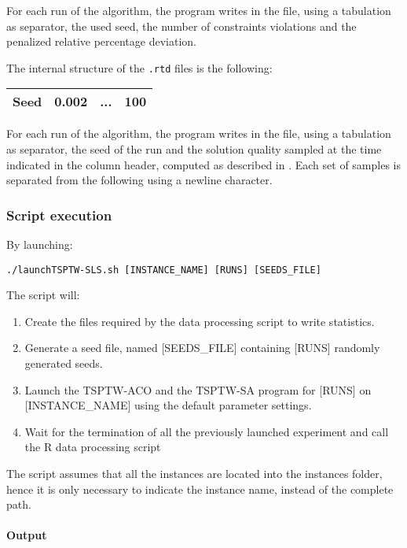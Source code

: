 \documentclass{article}
\begin{document}
For each run of the algorithm, the program writes in the file, using a tabulation as separator, the used seed, the number of constraints violations and the penalized relative percentage deviation.


The internal structure of the \verb|.rtd| files is the following: 
\begin{tabular}{|c|c|c|c|}
\hline
\textbf{Seed}	&	\textbf{0.002} & \textbf{...} & \textbf{100}  \\ \hline
\end{tabular}

For each run of the algorithm, the program writes in the file, using a tabulation as separator, the seed of the run and the solution quality sampled at the time indicated in the column header, computed as described in .
Each set of samples is separated from the following using a newline character.


\subsubsection{Script execution}
By launching:
\begin{center}
\begin{verbatim}
./launchTSPTW-SLS.sh [INSTANCE_NAME] [RUNS] [SEEDS_FILE]
\end{verbatim}
\end{center}

The script will:
\begin{enumerate}
  \item Create the files required by the data processing script to write statistics.
  \item Generate a seed file, named [SEEDS\_FILE] containing [RUNS] randomly generated seeds.
  \item Launch the TSPTW-ACO and the TSPTW-SA program for [RUNS] on [INSTANCE\_NAME] using the default parameter settings.
  \item Wait for the termination of all the previously launched experiment and call the R data processing script
\end{enumerate}

The script assumes that all the instances are located into the instances folder, hence it is only necessary to indicate the instance name, instead of the complete path.

\paragraph{Output}
\end{document}

